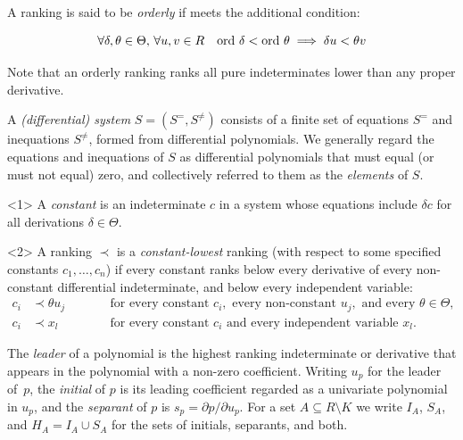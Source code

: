 \documentclass{article}
\theoremstyle{definition}
\theoremstyle{plain}
\begin{document}
A ranking is said to be {\it orderly} if meets the additional condition:

\begin{equation}
\forall \delta,\theta \in\Theta,\, \forall u,v \in R \quad {\rm ord}\ \delta < {\rm ord}\ \theta \implies \delta u < \theta v
\end{equation}

Note that an orderly ranking ranks all pure indeterminates lower than any proper derivative.

\begin{definition}
\label{def:system}
A {\it (differential) system} $S = (S^=, S^{\ne})$ consists of a finite set of equations $S^=$ and inequations $S^{\ne}$,
formed from differential polynomials.  We generally regard the equations and inequations of $S$ as differential polynomials
that must equal (or must not equal) zero, and collectively referred to them as the {\it elements} of $S$.
\end{definition}

\begin{definition}<1>
\label{def:constant}
A {\it constant} is an indeterminate $c$ in a system whose equations
include $\delta c$ for all derivations $\delta \in\Theta$.
\end{definition}

\begin{definition}<2>
\label{def:parametric-ranking}
A ranking $\prec$ is a {\it constant-lowest} ranking (with respect to some specified constants
$c_1, \ldots, c_n$) if every constant ranks below every derivative of every
non-constant differential indeterminate, and below every independent variable:
\[
\begin{alignedat}{2}
c_i &\prec \theta u_j &\qquad& \text{for every constant } c_i, \text{ every non-constant } u_j,
\text{ and every } \theta \in \Theta , \\
c_i &\prec x_l && \text{for every constant } c_i \text{ and every independent variable } x_l .
\end{alignedat}
\]
\end{definition}

The {\it leader} of a polynomial is the highest ranking indeterminate or derivative that appears in the polynomial
with a non-zero coefficient.
Writing $u_p$ for the leader of~$p$,
the {\it initial} of $p$ is its leading coefficient regarded as a
univariate polynomial in $u_p$, and the {\it separant} of $p$ is
$s_p = \partial p / \partial u_p$.  For a set $A \subseteq R \setminus K$
we write $I_A$, $S_A$, and $H_A = I_A \cup S_A$ for the sets of initials,
separants, and both.
\end{document}
